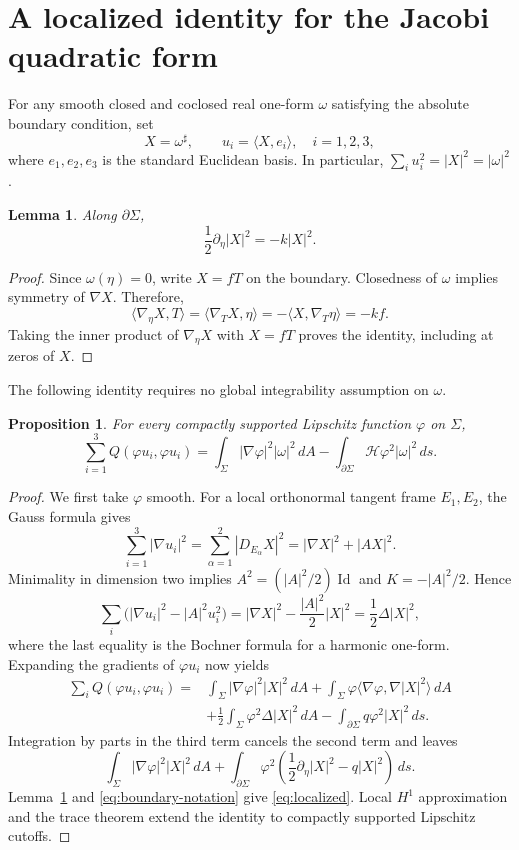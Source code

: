 \documentclass[11pt]{amsart}
\numberwithin{equation}{section}
\newtheorem{proposition}[theorem]{Proposition}
\newtheorem{lemma}[theorem]{Lemma}
\theoremstyle{definition}
\theoremstyle{remark}
\newcommand{\dd}{\,d}
\begin{document}
\section{A localized identity for the Jacobi quadratic form}\label{sec:energy}
For any smooth closed and coclosed real one-form $\omega$ satisfying the absolute boundary condition, set
\[
X=\omega^\sharp,\qquad u_i=\langle X,e_i\rangle,\quad i=1,2,3,
\]
where $e_1,e_2,e_3$ is the standard Euclidean basis. In particular,
$\sum_i u_i^2=|X|^2=|\omega|^2$.

\begin{lemma}\label{lem:boundary-bochner}
Along $\partial\Sigma$,
\[
\frac12\partial_\eta|X|^2=-k|X|^2.
\]
\end{lemma}
\begin{proof}
Since $\omega(\eta)=0$, write $X=fT$ on the boundary. Closedness of $\omega$ implies symmetry of $\nabla X$. Therefore,
\[
\langle\nabla_\eta X,T\rangle
=\langle\nabla_T X,\eta\rangle
=-\langle X,\nabla_T\eta\rangle=-kf.
\]
Taking the inner product of $\nabla_\eta X$ with $X=fT$ proves the identity, including at zeros of $X$.
\end{proof}

The following identity requires no global integrability assumption on $\omega$.

\begin{proposition}\label{prop:energy}
For every compactly supported Lipschitz function $\varphi$ on $\Sigma$,
\begin{equation}\label{eq:localized}
\sum_{i=1}^3Q(\varphi u_i,\varphi u_i)
=\int_\Sigma|\nabla\varphi|^2|\omega|^2\dd A
-\int_{\partial\Sigma}\mathscr H\varphi^2|\omega|^2\dd s.
\end{equation}
\end{proposition}
\begin{proof}
We first take $\varphi$ smooth. For a local orthonormal tangent frame $E_1,E_2$, the Gauss formula gives
\[
\sum_{i=1}^3|\nabla u_i|^2
=\sum_{\alpha=1}^2|D_{E_\alpha}X|^2
=|\nabla X|^2+|AX|^2.
\]
Minimality in dimension two implies
$A^2=(|A|^2/2)\operatorname{Id}$ and $K=-|A|^2/2$. Hence
\[
\sum_i\bigl(|\nabla u_i|^2-|A|^2u_i^2\bigr)
=|\nabla X|^2-\frac{|A|^2}{2}|X|^2
=\frac12\Delta|X|^2,
\]
where the last equality is the Bochner formula for a harmonic one-form. Expanding the gradients of $\varphi u_i$ now yields
\begin{align*}
\sum_iQ(\varphi u_i,\varphi u_i)
={}&\int_\Sigma|\nabla\varphi|^2|X|^2\dd A
+\int_\Sigma\varphi\langle\nabla\varphi,\nabla|X|^2\rangle\dd A\\
&+\frac12\int_\Sigma\varphi^2\Delta|X|^2\dd A
-\int_{\partial\Sigma}q\varphi^2|X|^2\dd s.
\end{align*}
Integration by parts in the third term cancels the second term and leaves
\[
\int_\Sigma|\nabla\varphi|^2|X|^2\dd A
+\int_{\partial\Sigma}\varphi^2
\left(\frac12\partial_\eta|X|^2-q|X|^2\right)\dd s.
\]
Lemma~\ref{lem:boundary-bochner} and \eqref{eq:boundary-notation} give \eqref{eq:localized}. Local $H^1$ approximation and the trace theorem extend the identity to compactly supported Lipschitz cutoffs.
\end{proof}
\end{document}
